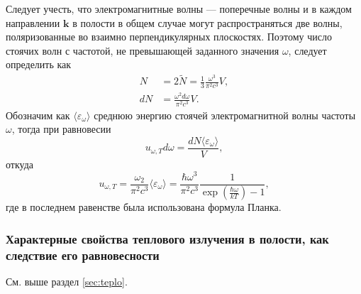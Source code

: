 Следует учесть, что электромагнитные волны --- поперечные
волны и в каждом направлении $ \mathbf k $ в полости в общем случае могут
распространяться две волны, поляризованные во взаимно 
перпендикулярных плоскостях. Поэтому число стоячих волн с частотой,
не превышающей заданного значения $ \omega $, следует определить как 
\begin{align*}
  N &= 2\tilde N = \frac{1}{3} \frac{\omega^3}{\pi^2 c^3}V,\\
  dN &= \frac{\omega^2 d\omega}{\pi^2 c^3}V.
\end{align*}
Обозначим как $ \langle \varepsilon_\omega \rangle $ среднюю энергию стоячей
электромагнитной волны частоты $ \omega $, тогда при равновесии
\[
  u_{\omega, T}d\omega = \frac{dN\langle \varepsilon_\omega \rangle}{V},  
\]
откуда  
\[
  u_{\omega, T} = \frac{\omega_2}{\pi^2 c^3} \langle \varepsilon_\omega \rangle
= \frac{\hbar \omega^3}{\pi^2 c^3} \frac{1}{\exp(\frac{\hbar\omega}{kT}) - 1},
\]
где в последнем равенстве была использована формула Планка.


\subsubsection{Характерные свойства теплового излучения в полости, как следствие его равновесности}
См. выше раздел \ref{sec:teplo}.





